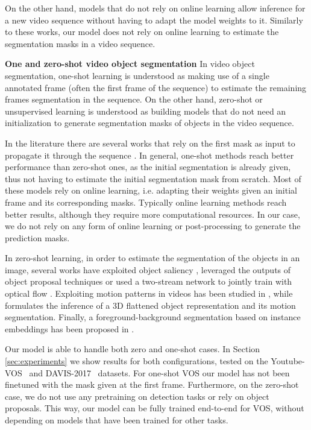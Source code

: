 \documentclass[10pt,twocolumn,letterpaper]{article}
\begin{document}
On the other hand, models that do not rely on online learning \cite{Cheng_favos_2018, yang2018efficient} allow inference for a new video sequence without having to adapt the model weights to it. Similarly to these works, our model does not rely on online learning to estimate the segmentation masks in a video sequence. 



\fi

\textbf{One and zero-shot video object segmentation}
In video object segmentation, one-shot learning is understood as making use of a single annotated frame (often the first frame of the sequence) to estimate the remaining frames segmentation in the sequence. On the other hand, zero-shot or unsupervised learning is understood as building models that do not need an initialization to generate segmentation masks of objects in the video sequence. 

In the literature there are several works that rely on the first mask as input to propagate it through the sequence \cite{caelles2017one, voigtlaender2017online, perazzi2017learning, yang2018efficient, jampani2017video, tokmakov2017learning, hu2017maskrnn}. In general, one-shot methods reach better performance than zero-shot ones, as the initial segmentation is already given, thus not having to estimate the initial segmentation mask from scratch.
Most of these models rely on online learning, i.e. adapting their weights given an initial frame and its corresponding masks. Typically online learning methods reach better results, although they require more computational resources. In our case, we do not rely on any form of online learning or post-processing to generate the prediction masks.

In zero-shot learning, in order to estimate the segmentation of the objects in an image, several works have exploited object saliency \cite{song2018pyramid, jain2017fusionseg, hu2018unsupervised}, leveraged the outputs of object proposal techniques \cite{koh2017primary} or used a two-stream network to jointly train with optical flow \cite{cheng2017segflow}. Exploiting motion patterns in videos has been studied in \cite{tokmakov2017learning_motion}, while \cite{lao2018extending} formulates the inference of a 3D flattened object representation and its motion segmentation. Finally, a foreground-background segmentation based on instance embeddings has been proposed in \cite{li2018}.

Our model is able to handle both zero and one-shot cases. In Section \ref{sec:experiments} we show results for both configurations, tested on the  Youtube-VOS~\cite{xu2018youtube-benchmark} and DAVIS-2017~\cite{Pont-Tuset_arXiv_2017} datasets. For one-shot VOS our model has not been finetuned with the mask given at the first frame. Furthermore, on the zero-shot case, we do not use any pretraining on detection tasks or rely on object proposals. This way, our model can be fully trained end-to-end for VOS, without depending on models that have been trained for other tasks.
\end{document}
